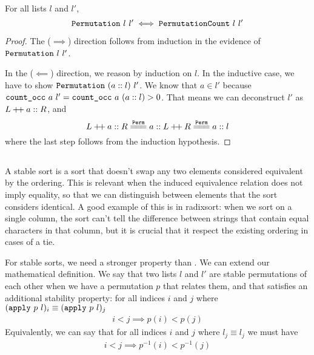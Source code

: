 \documentclass[sigplan,10pt,anonymous,review]{thesis}
\begin{document}
\begin{theorem}
  For all lists $l$ and $l'$,
  \begin{equation*}
    \texttt{\textup{Permutation}}~l~l' \iff \texttt{\textup{PermutationCount}}~l~l'
  \end{equation*}
\end{theorem}
\begin{proof}
  The ($\implies$) direction follows from induction in the evidence of
  $\texttt{\textup{Permutation}}~l~l'$.

  In the ($\impliedby$) direction, we reason by induction on $l$. In
  the inductive case, we have to show $\texttt{\textup{Permutation}}~(a::l)~l'$.
  We know that $a \in l'$ because $\texttt{\textup{count\_occ}}~a~l' =
  \texttt{\textup{count\_occ}}~a~(a::l) > 0$. That means we can deconstruct $l'$
  as $L \mathbin{+\mkern-3mu+} a :: R$, and
  \begin{equation*}
    L \dplus a :: R \eqperm a :: L \dplus R \eqperm a :: l
  \end{equation*}
  where the last step follows from the induction hypothesis.
\end{proof}

\subsection{}
\label{subsec:stable}

A stable sort is a sort that doesn't swap any two elements considered
equivalent by the ordering. This is relevant when the induced
equivalence relation does not imply equality, so that we can
distinguish between elements that the sort considers identical. A good
example of this is in radixsort: when we sort on a single column, the
sort can't tell the difference between strings that contain equal
characters in that column, but it is crucial that it respect the
existing ordering in cases of a tie.

For stable sorts, we need a stronger property than .
We can extend our mathematical definition. We say that two lists $l$
and $l'$ are stable permutations of each other when we have a
permutation $p$ that relates them, and that satisfies an additional
stability property: for all indices $i$ and $j$ where
$(\texttt{\textup{apply}}~p~l)_i \equiv (\texttt{\textup{apply}}~p~l)_j$
\begin{gather*}
  i < j \implies p(i) < p(j)
\end{gather*}
Equivalently, we can say that for all indices $i$ and $j$ where $l_j \equiv
l_j$ we must have
\begin{gather*}
  i < j \implies p^{-1}(i) < p^{-1}(j)
\end{gather*}
\end{document}

